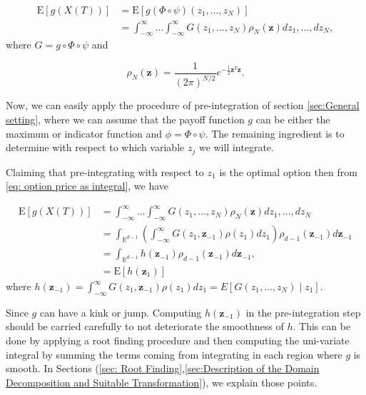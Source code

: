 \documentclass[11pt]{article}
\newcommand{\expt}[1]{\mathrm{E}\left[#1\right]}
\newcommand{\rset}{\mathbb{R}}
\newcommand{\PERIOD}{.}
\newcommand{\COMMA}{,}
\begin{document}
\begin{align}\label{eq: option price as integral}
\expt{g(X(T))}&=		\expt{g\left(\Phi \circ \psi \right) (z_1,\dots,z_N)} \nonumber\\
&=\int_{-\infty}^{\infty} \dots \int_{-\infty}^{\infty} G(z_1,\dots,z_N) \rho_N(\mathbf{z}) dz_1,\dots,dz_N \COMMA
\end{align}
where $G=g \circ \Phi \circ \psi$ and

\begin{equation}\label{eq: multivariate gaussian distribution}
\rho_N(\mathbf{z})=\frac{1}{(2 \pi)^{N/2}} e^{-\frac{1}{2} \mathbf{z}^T \mathbf{z}} \PERIOD
\end{equation}


Now, we can easily apply the procedure of pre-integration  of section \ref{sec:General setting}, where we can assume that the payoff function $g$ can be either the  maximum or indicator function and $\phi=\Phi \circ \psi$. The remaining ingredient is to determine with respect to which variable $z_j$ we will integrate.



Claiming that pre-integrating with respect to $z_1$ is the optimal option then from \eqref{eq: option price as integral}, we have

\begin{align}\label{eq: pre_integration_step_wrt_y1}
\expt{g(X(T))}&=\int_{-\infty}^{\infty} \dots \int_{-\infty}^{\infty} G(z_1,\dots,z_N) \rho_N(\mathbf{z}) dz_1,\dots,dz_N \nonumber\\ 
&=\int_{\rset^{d-1}} \left(\int_{-\infty}^\infty G(z_1,\mathbf{z}_{-1}) \rho(z_1) dz_1  \right) \rho_{d-1}(\mathbf{z}_{-1}) d\mathbf{z}_{-1}\nonumber\\	
&=\int_{\rset^{d-1}} h(\mathbf{z}_{-1}) \rho_{d-1}(\mathbf{z}_{-1}) d\mathbf{z}_{-1}\COMMA \\ \nonumber
	&=\expt{h(\mathbf{z}_1)}
\end{align}
where $h(\mathbf{z}_{-1})=\int_{-\infty}^\infty G(z_1,\mathbf{z}_{-1}) \rho(z_1) dz_1=  E\left[ G\left(z_1, \ldots, z_N \right)  \mid z_1\right] $.


Since $g$ can have a kink  or jump. Computing $h(\mathbf{z}_{-1})$ in the pre-integration step should be carried carefully to not deteriorate the smoothness of $h$. This can be done by applying a root finding procedure and then computing the uni-variate integral by summing the terms coming from integrating in each region where $g$ is smooth. In Sections (\ref{sec: Root Finding},\ref{sec:Description of the Domain Decomposition and Suitable Transformation}), we explain those points.
\end{document}
